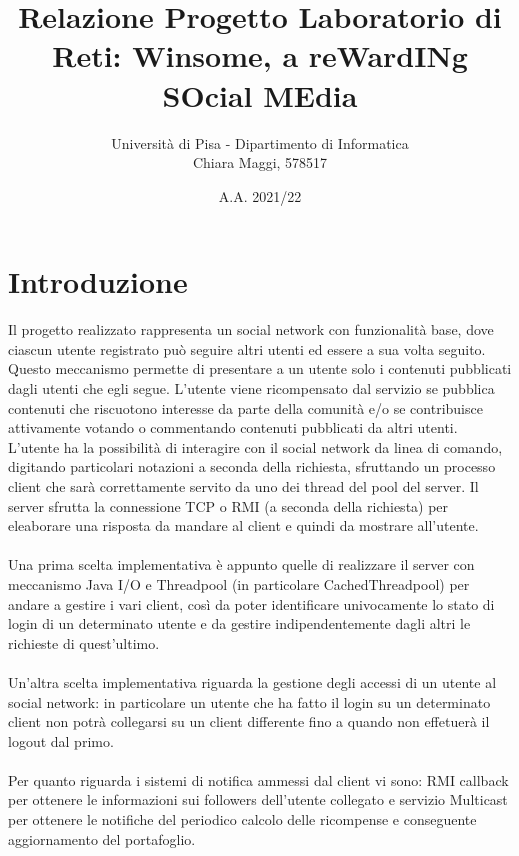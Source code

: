 \documentclass[11pt, a4paper, oneside]{article}
\begin{document}
\title{Relazione Progetto Laboratorio di Reti: Winsome, a reWardINg SOcial MEdia}
\author{Università di Pisa - Dipartimento di Informatica \\ Chiara Maggi, 578517}
\date{A.A. 2021/22}
\maketitle
\tableofcontents

\section{Introduzione}
Il progetto realizzato rappresenta un social network con funzionalità base, dove ciascun utente registrato può seguire altri utenti ed essere a sua volta seguito. 
Questo meccanismo permette di presentare a un utente solo i contenuti pubblicati dagli utenti che egli segue. L’utente viene ricompensato dal servizio se pubblica
contenuti che riscuotono interesse da parte della comunità e/o se contribuisce attivamente votando o commentando contenuti pubblicati da altri utenti.\\
L'utente ha la possibilità di interagire con il social network da linea di comando, digitando particolari notazioni a seconda della richiesta,
sfruttando un processo client che sarà correttamente servito da uno dei thread del pool del server. Il server sfrutta la connessione TCP o RMI (a seconda della richiesta)
per eleaborare una risposta da mandare al client e quindi da mostrare all'utente.\\ \\
Una prima scelta implementativa è appunto quelle di realizzare il server con meccanismo Java I/O e Threadpool (in particolare CachedThreadpool) per andare a gestire
i vari client, così da poter identificare univocamente lo stato di login di un determinato utente e da gestire indipendentemente dagli altri le richieste di quest'ultimo.\\ \\
Un'altra scelta implementativa riguarda la gestione degli accessi di un utente al social network: in particolare un utente che ha fatto il login su un determinato 
client non potrà collegarsi su un client differente fino a quando non effetuerà il logout dal primo.\\ \\
Per quanto riguarda i sistemi di notifica ammessi dal client vi sono: RMI callback per ottenere le informazioni sui followers dell'utente collegato e servizio Multicast 
per ottenere le notifiche del periodico calcolo delle ricompense e conseguente aggiornamento del portafoglio. 
\end{document}
